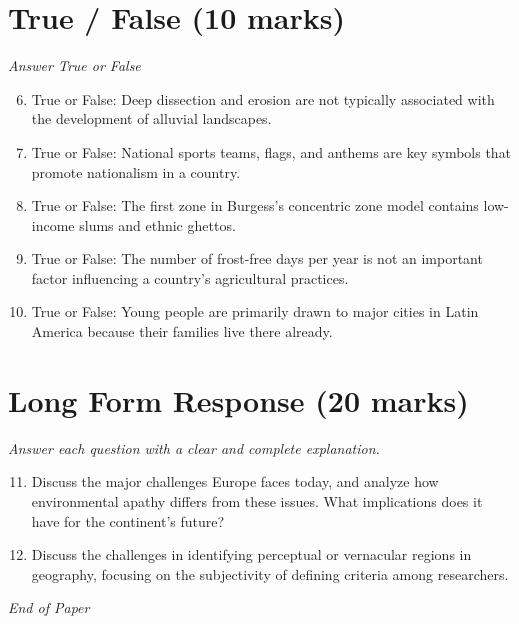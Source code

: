 \documentclass[12pt]{article}
\begin{document}
\section*{True / False (10 marks)}
\textit{Answer True or False}
\begin{enumerate}[label=\arabic*.]
\setcounter{enumi}{5}
\item True or False: Deep dissection and erosion are not typically associated with the development of alluvial landscapes.
\item True or False: National sports teams, flags, and anthems are key symbols that promote nationalism in a country.
\item True or False: The first zone in Burgess's concentric zone model contains low-income slums and ethnic ghettos.
\item True or False: The number of frost-free days per year is not an important factor influencing a country's agricultural practices.
\item True or False: Young people are primarily drawn to major cities in Latin America because their families live there already.
\end{enumerate}

\section*{Long Form Response (20 marks)}
\textit{Answer each question with a clear and complete explanation.}
\begin{enumerate}[label=\arabic*.]
\setcounter{enumi}{10}
\item Discuss the major challenges Europe faces today, and analyze how environmental apathy differs from these issues. What implications does it have for the continent's future?
\item Discuss the challenges in identifying perceptual or vernacular regions in geography, focusing on the subjectivity of defining criteria among researchers.
\end{enumerate}

\vfill
\noindent\textit{End of Paper}
\end{document}
